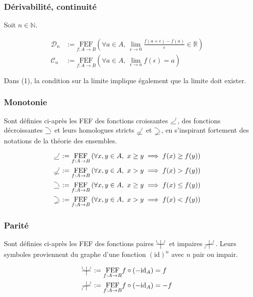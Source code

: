 \documentclass{article}
\newcommand{\R}{{\mathbb R}}
\newcommand{\FEF}[1]{\underset{f:A\to B}{\text{FEF}}#1}
\newcommand{\N}{{\mathbb N}}
\newcommand{\cC}{{\mathcal C}}
\newcommand{\cD}{{\mathcal D}}
\newcommand{\decreasingfunctions}{%
	\begin{tikzpicture}[scale=1.75, baseline=0]%
		\draw (0,-0.25ex) -- (1ex,-0.25ex);%
		\draw (1ex,0) arc (0:90:1ex);%
	\end{tikzpicture}\,%
}
\newcommand{\strictlydecreasingfunctions}{%
	\begin{tikzpicture}[scale=1.75, baseline=0]%
		\draw (0,-0.25ex) -- (1ex,-0.25ex);%
		\draw (1ex,0) arc (0:90:1ex);%
		\draw (0.75ex,0.125ex) -- (0.25ex,-0.5ex);%
	\end{tikzpicture}\,%
}
\newcommand{\increasingfunctions}{%
	\begin{tikzpicture}[scale=1.75, baseline=0]%
		\draw (0,-0.25ex) -- (1ex,-0.25ex);%
		\draw (0,0) arc (-90:0:1ex);%
	\end{tikzpicture}\,%
}
\newcommand{\strictlyincreasingfunctions}{%
	\begin{tikzpicture}[scale=1.75, baseline=0]%
		\draw (0,-0.25ex) -- (1ex,-0.25ex);%
		\draw (0,0) arc (-90:0:1ex);%
		\draw (0.75ex,0.125ex) -- (0.25ex,-0.5ex);%
	\end{tikzpicture}\,%
}
\newcommand{\evenfunctions}{%
	\begin{tikzpicture}[scale=1.5, baseline=-0.5ex]%
		\draw (-1ex,0) -- (1ex,0);%
		\draw (0,-1ex) -- (0, 1ex);%
		\draw (0ex, 0ex) arc (-90:0:1ex);%
		\draw (0ex, 0ex) arc (90:0:-1ex);%
	\end{tikzpicture}\,%
}
\newcommand{\oddfunctions}{%
	\begin{tikzpicture}[scale=1.5, baseline=-0.5ex]%
		\draw (-1ex,0) -- (1ex,0);%
		\draw (0,-1ex) -- (0, 1ex);%
		\draw (0ex, 0ex) arc (-90:0:1ex);%
		\draw (0ex, 0ex) arc (-90:0:-1ex);%
	\end{tikzpicture}\,%
}
\begin{document}
\subsubsection{Dérivabilité, continuité}

Soit $n \in \N$.

\begin{align}
	\cD_n &:= \FEF{\left(\forall a\in A,\ \lim_{\epsilon \to 0} \frac{f(a+\epsilon)-f(a)}{\epsilon} \in \R\right)}  \\
	\cC_n &:= \FEF{\left( \forall a\in A,\ \lim_{\epsilon \to a} f(\epsilon) = a \right)  } 
\end{align}

Dans (1), la condition sur la limite implique également que la limite doit exister.

\subsubsection{Monotonie}

Sont définies ci-après les FEF des fonctions croissantes $\increasingfunctions$, des fonctions décroissantes $\decreasingfunctions$ et leurs homologues stricts $\strictlyincreasingfunctions$ et $\strictlydecreasingfunctions$, en s'inspirant fortement des notations de la théorie des ensembles.

\begin{align*}
	\increasingfunctions &:= \FEF{\left(\forall x,y\in A,\ x \ge y \implies f(x) \ge f(y)\right) } \\
	\strictlyincreasingfunctions &:= \FEF{\left(\forall x,y\in A,\ x > y \implies f(x) > f(y)\right) } \\
	\decreasingfunctions &:= \FEF{\left(\forall x,y\in A,\ x \ge y \implies f(x) \le f(y)\right) } \\
	\strictlydecreasingfunctions &:= \FEF{\left(\forall x,y\in A,\ x > y \implies f(x) < f(y)\right) } \\
\end{align*}

\subsubsection{Parité}
Sont définies ci-après les FEF des fonctions paires $\evenfunctions$ et impaires $\oddfunctions$. Leurs symboles proviennent du graphe d'une fonction $(\text{id})^n$ avec $n$ pair ou impair.

\begin{align*}
	\evenfunctions &:= \FEF{f \circ (-\text{id}_A) = f } \\
	\oddfunctions &:= \FEF{f \circ (-\text{id}_A) = -f} 
\end{align*}
\end{document}
